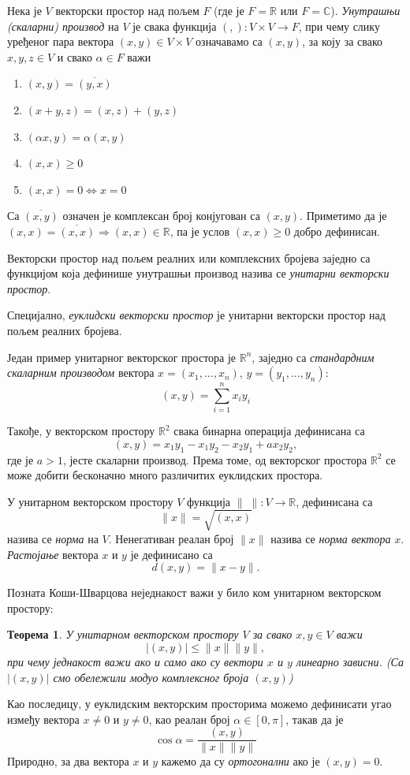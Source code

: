 \documentclass{report}
\theoremstyle{plain}
\newtheorem{thm}{Теорема}
\theoremstyle{definition}
\begin{document}
Нека је $V$ векторски простор над пољем $F$ (где је $F=\mathbb{R}$ или $F=\mathbb{C}$). \emph{Унутрашњи (скаларни) производ} на $V$ је свака функција $(,):V\times V\to F$, при чему слику уређеног пара вектора $(x, y)\in V\times V$ означавамо са $(x, y)$, за коју за свако $x, y, z\in V$ и свако $\alpha \in F$ важи
\begin{enumerate}
  \item $(x, y) = \overline{(y, x)}$
  \item $(x+y, z) = (x, z)+(y, z)$
  \item $(\alpha x, y) = \alpha (x, y)$
  \item $(x, x)\geq 0$
  \item $(x, x) = 0 \Leftrightarrow x=0$
\end{enumerate}
Са $\overline{(x, y)}$ означен је комплексан број конјугован са $(x, y)$. Приметимо да је $(x, x) = \overline{(x, x)} \Rightarrow (x, x)\in \mathbb{R}$, па је услов $(x, x)\geq 0$ добро дефинисан.

Векторски простор над пољем реалних или комплексних бројева заједно са функцијом која дефинише унутрашњи производ назива се \emph{унитарни векторски простор}.

Специјално, \emph{еуклидски векторски простор} је унитарни векторски простор над пољем реалних бројева.

Један пример унитарног векторског простора је $\mathbb{R}^n$, заједно са \emph{стандардним скаларним производом} вектора $x = (x_1, ..., x_n)$, $y = (y_1, ..., y_n)$:
$$(x, y) = \sum_{i=1}^{n} x_iy_i$$

Такође, у векторском простору $\mathbb{R}^2$ свака бинарна операција дефинисана са
$$(x, y) = x_1y_1 - x_1y_2 - x_2y_1 +ax_2y_2,$$
где је $a>1$, јесте скаларни производ. Према томе, од векторског простора $\mathbb{R}^2$ се може добити бесконачно много различитих еуклидских простора.

У унитарном векторском простору $V$ функција $\|\;\|:V\to \mathbb{R}$, дефинисана са $$\|x\| = \sqrt{(x, x)}$$ назива се \emph{норма} на $V$. Ненегативан реалан број $\|x\|$ назива се \emph{норма вектора} $x$.
\emph{Растојање} вектора $x$ и $y$ је дефинисано са $$d(x, y) = \|x-y\|.$$

Позната Коши-Шварцова неједнакост важи у било ком унитарном векторском простору:
\begin{thm}
У унитарном векторском простору $V$ за свако $x, y\in V$ важи
$$|(x, y)|\leq\|x\|\|y\|,$$
при чему једнакост важи ако и само ако су вектори $x$ и $y$ линеарно зависни. (Са $|(x, y)|$ смо обележили модуо комплексног броја $(x, y)$)
\end{thm}
Као последицу, у еуклидским векторским просторима можемо дефинисати угао између вектора $x\neq 0$ и $y\neq 0$, као реалан број $\alpha\in [0, \pi]$, такав да је $$\cos \alpha = \frac{(x, y)}{\|x\|\|y\|}$$
Природно, за два вектора $x$ и $y$ кажемо да су \emph{ортогонални} ако је $(x, y) = 0$.
\end{document}

